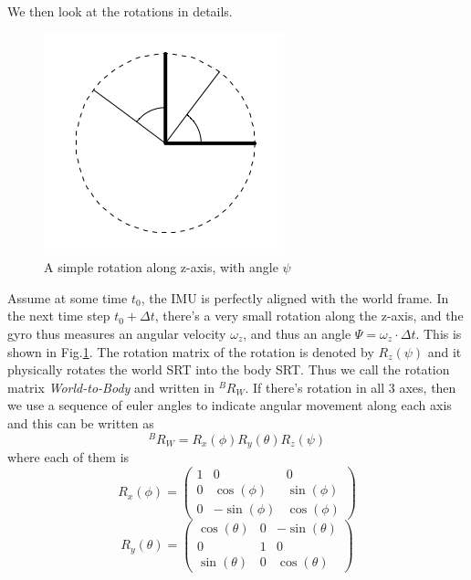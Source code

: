 \documentclass[twoside]{article}
\begin{document}
\begin{multicols}{2}
We then look at the rotations in details.
\begin{figure}[H]
\centering
\includegraphics[width=0.5\columnwidth]{fig/rot.png} 
\caption{A simple rotation along z-axis, with angle $\psi$}
\label{fig:rotz}
\end{figure}
Assume at some time $t_0$, the IMU is perfectly aligned with the world frame. In the next time step $t_0+\Delta t$, there's a very small rotation along the z-axis, and the gyro thus measures an angular velocity $\omega_z$, and thus an angle $\Psi = \omega_z \cdot \Delta t$. This is shown in Fig.\ref{fig:rotz}. The rotation matrix of the rotation is denoted by $R_z(\psi)$ and it physically rotates the world SRT into the body SRT. Thus we call the rotation matrix \textit{World-to-Body} and written in $^BR_W$. If there's rotation in all 3 axes, then we use a sequence of euler angles to indicate angular movement along each axis and this can be written as
\begin{equation}
^BR_W = R_x(\phi)R_y(\theta)R_z(\psi)
\end{equation}
where each of them is
\begin{equation}
R_x(\phi) = \left(\begin{array}{ccc} 1 & 0 & 0\\ 0 & \cos\!\left(\phi{}\right) & \sin\!\left(\phi{}\right)\\ 0 & - \sin\!\left(\phi{}\right) & \cos\!\left(\phi{}\right) \end{array}\right)
\end{equation}
\begin{equation}
R_y(\theta) = \left(\begin{array}{ccc} \cos\!\left(\theta{}\right) & 0 & - \sin\!\left(\theta{}\right)\\ 0 & 1 & 0\\ \sin\!\left(\theta{}\right) & 0 & \cos\!\left(\theta{}\right) \end{array}\right)

\end{equation}
\end{multicols}
\end{document}
